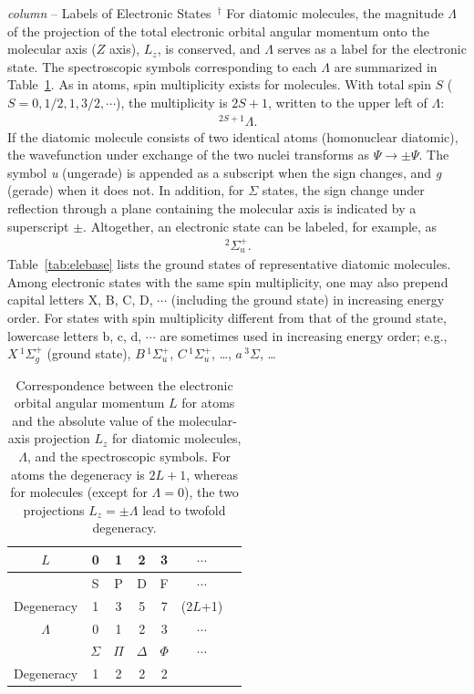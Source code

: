 \begin{itembox}{{\it column} -- Labels of Electronic States $\,^\dagger$}
\footnotesize
For diatomic molecules, the magnitude $\Lambda$ of the projection of the total electronic orbital angular momentum onto the molecular axis ($Z$ axis), $L_z$, is conserved, and $\Lambda$ serves as a label for the electronic state. The spectroscopic symbols corresponding to each $\Lambda$ are summarized in Table~\ref{tab:spesymbol}. As in atoms, spin multiplicity exists for molecules. With total spin $S$ ($S=0,1/2,1,3/2,\cdots$), the multiplicity is $2S+1$, written to the upper left of $\Lambda$:
\begin{eqnarray}
    \,^{2S+1} \Lambda.
\end{eqnarray}
If the diatomic molecule consists of two identical atoms (homonuclear diatomic), the wavefunction under exchange of the two nuclei transforms as $\Psi \to \pm \Psi$. The symbol \emph{u} (ungerade) is appended as a subscript when the sign changes, and \emph{g} (gerade) when it does not. In addition, for $\Sigma$ states, the sign change under reflection through a plane containing the molecular axis is indicated by a superscript $\pm$. Altogether, an electronic state can be labeled, for example, as
\begin{eqnarray}
    \,^{2} \Sigma_u^+ .
\end{eqnarray}
Table~\ref{tab:elebase} lists the ground states of representative diatomic molecules. Among electronic states with the same spin multiplicity, one may also prepend capital letters X, B, C, D, $\cdots$ (including the ground state) in increasing energy order. For states with spin multiplicity different from that of the ground state, lowercase letters b, c, d, $\cdots$ are sometimes used in increasing energy order; e.g.,
$X\,^1 \Sigma_g^+$ (ground state), $B\,^1 \Sigma_u^+$, $C\,^1 \Sigma_u^+$, …, $a\,^3 \Sigma$, …
\end{itembox}

\begin{table}[]
    \centering
    \begin{tabular}{c|cccccc}
    \hline\hline
        $L$ & 0 & 1 & 2 & 3 & $\cdots$  \\
        \hline
          & S & P & D & F & $\cdots$  \\
          Degeneracy & 1 & 3 & 5 & 7 & (2$L$+1) \\
        \hline\hline
        $\Lambda$ & 0 & 1 & 2 & 3 & $\cdots$  \\
        \hline
        & $\Sigma$ & $\Pi$ & $\Delta$ & $\Phi$ & $\cdots$ \\
        Degeneracy & 1 & 2 & 2 & 2 &  
    \end{tabular}
    \caption{Correspondence between the electronic orbital angular momentum $L$ for atoms and the absolute value of the molecular-axis projection $L_z$ for diatomic molecules, $\Lambda$, and the spectroscopic symbols. For atoms the degeneracy is $2L+1$, whereas for molecules (except for $\Lambda=0$), the two projections $L_z=\pm \Lambda$ lead to twofold degeneracy.}
    \label{tab:spesymbol}
\end{table}

